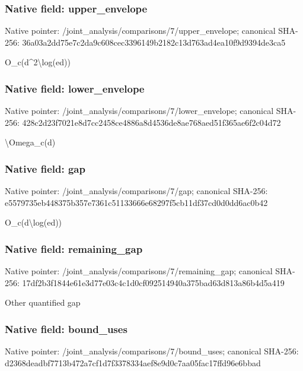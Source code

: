 \documentclass[10pt,a4paper]{article}
\begin{document}
\subsubsection{Native field: upper\_envelope}


Native pointer: /joint\_analysis/comparis\allowbreak{}ons/7/upper\_envelope; canonical SHA-256: 36a03a2dd75e7c2da9c608ce\allowbreak{}c3396149b2182c13d763ad4e\allowbreak{}a10f9d9394de3ca5


O\_c(d\textasciicircum{}2\textbackslash{}log(ed))


\subsubsection{Native field: lower\_envelope}


Native pointer: /joint\_analysis/comparis\allowbreak{}ons/7/lower\_envelope; canonical SHA-256: 428c2d23f7021e8d7cc2458c\allowbreak{}e4886a8d4536de8ae768aed5\allowbreak{}1f365ae6f2c04d72


\textbackslash{}Omega\_c(d)


\subsubsection{Native field: gap}


Native pointer: /joint\_analysis/comparisons/7/gap; canonical SHA-256: e5579735eb448375b357e736\allowbreak{}1c51133666e68297f5cb11df\allowbreak{}37cd0d0dd6ac0b42


O\_c(d\textbackslash{}log(ed))


\subsubsection{Native field: remaining\_gap}


Native pointer: /joint\_analysis/comparis\allowbreak{}ons/7/remaining\_gap; canonical SHA-256: 17df2b3f1844e61e3d77e03c\allowbreak{}4c1d0cf092514940a375bad6\allowbreak{}3d813a86b4d5a419


Other quantified gap


\subsubsection{Native field: bound\_uses}


Native pointer: /joint\_analysis/comparis\allowbreak{}ons/7/bound\_uses; canonical SHA-256: d2368deadbf7713b472a7cf1\allowbreak{}d7f3378334aef8e9d0c7aa05\allowbreak{}fac17ffd96e6bbad
\end{document}
